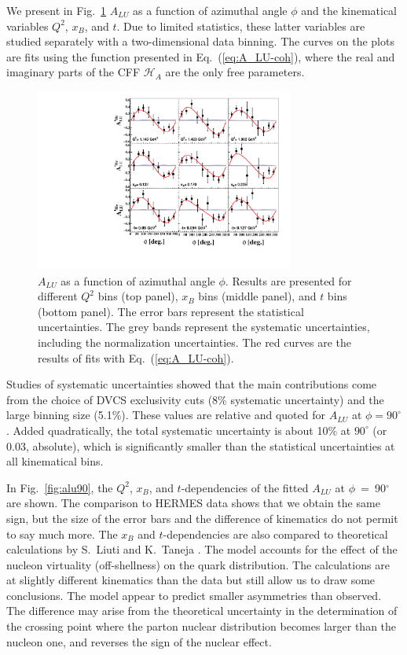 \documentclass[twocolumn,nofootinbib,showpacs,prl,superscriptaddress,secnumarabic,amssymb,nobibnotes,aps,floatfix]{revtex4}
\begin{document}
We present in Fig.~\ref{fig:alu} $A_{LU}$ as a function of azimuthal angle 
$\phi$ and the kinematical variables $Q^2$, $x_B$, and $t$. Due to limited 
statistics, these latter variables are studied separately with a two-dimensional 
data binning. The curves on 
the plots are fits using the function presented in Eq.~(\ref{eq:A_LU-coh}), 
where the real and imaginary parts of the CFF $\mathcal{H}_{A}$ are the only 
free parameters. 

\begin{figure}[tb]
   \centering
\includegraphics[width=8.5cm]{figs/F_Coherent_ALU_phi.pdf}
\caption{$A_{LU}$ as a function of azimuthal angle $\phi$. Results are presented
   for different $Q^{2}$ bins (top panel), $x_{B}$ bins (middle panel), and $t$ 
   bins (bottom panel).  The error bars represent the statistical 
   uncertainties. The grey bands represent the systematic uncertainties, 
   including the normalization uncertainties. The red curves are the results of 
   fits with Eq.~(\ref{eq:A_LU-coh}).}
\label{fig:alu}
\end{figure}

Studies of systematic uncertainties showed that the main contributions 
come from the choice of DVCS exclusivity cuts (8\% systematic uncertainty) and the 
large binning size (5.1\%). These values are relative and quoted for $A_{LU}$
at $\phi=90^\circ$. Added quadratically, the total systematic uncertainty
is about 10\% at $90^\circ$ (or 0.03, absolute), which is significantly smaller
than the statistical uncertainties at all kinematical bins. 

In Fig.~\ref{fig:alu90}, the $Q^2$, $x_{B}$, and $t$-dependencies of the fitted 
$A_{LU}$ at $\phi$~=~90$^{\circ}$ are shown. The comparison to HERMES data
shows that we obtain the same sign, but the size of the error bars and the difference
of kinematics do not permit to say much more. The $x_{B}$ and $t$-dependencies 
are also compared to theoretical calculations by S.~Liuti and K.~Taneja 
\cite{simonetta_2}. The model accounts for the effect of the nucleon virtuality 
(off-shellness) on the quark distribution. The calculations are at slightly 
different kinematics than the data but still allow us to draw some conclusions. The 
model appear to predict smaller asymmetries than observed. 
The difference may arise from the theoretical uncertainty in the determination 
of the crossing point where the parton nuclear distribution becomes larger than the 
nucleon one, and reverses the sign of the nuclear effect.
\end{document}
